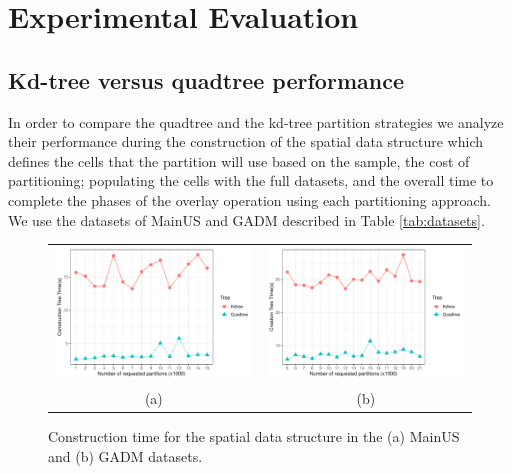 \section{Experimental Evaluation} %

\subsection{Kd-tree versus quadtree performance} \label{sec:comparison}
In order to compare the quadtree and the kd-tree partition strategies we analyze their performance during the construction of the spatial data structure which defines the cells that the partition will use based on the sample, the cost of partitioning; populating the cells with the full datasets, and the overall time to complete the phases of the overlay operation using each partitioning approach.  We use the datasets of MainUS and GADM described in Table \ref{tab:datasets}.

 \begin{figure}
     \centering
     \begin{tabular}{cc}
         \includegraphics[width=0.49\linewidth]{chapterSDCEL/K_Creation_US.pdf} & \includegraphics[width=0.49\linewidth]{chapterSDCEL/K_Creation_GADM.pdf} \\
         (a) & (b)
     \end{tabular}
     \caption{Construction time for the spatial data structure in the (a) MainUS and (b) GADM datasets.} \label{fig:k_creation_us}
 \end{figure}

